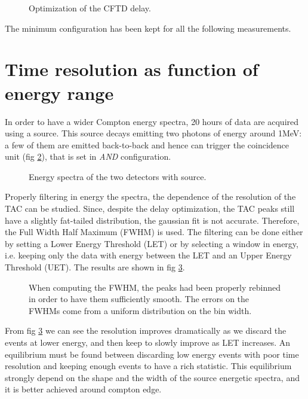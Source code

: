 \documentclass[11pt,a4 paper]{article}
\begin{document}
\begin{figure}[H]
    \centering
    \caption{Optimization of the CFTD delay.}
    \label{fig:CFTD:delay}
\end{figure}

The minimum configuration has been kept for all the following measurements.

\section{Time resolution as function of energy range} \label{sec:Co}
In order to have a wider Compton energy spectra, 20 hours of data are acquired using a  source. This source decays emitting two photons of energy around 1\si{\mega\electronvolt}: a few of them are emitted back-to-back and hence can trigger the coincidence unit (fig \ref{fig:Co:spectra}), that is set in \emph{AND} configuration.


\begin{figure}[H]
    \centering
    \caption{Energy spectra of the two detectors with  source.}
    \label{fig:Co:spectra}
\end{figure}

Properly filtering in energy the spectra, the dependence of the resolution of the TAC can be studied. Since, despite the delay optimization, the TAC peaks still have a slightly fat-tailed distribution, the gaussian fit is not accurate. Therefore, the Full Width Half Maximum (FWHM) is used.
The filtering can be done either by setting a Lower Energy Threshold (LET) or by selecting a window in energy, i.e. keeping only the data with energy between the LET and an Upper Energy Threshold (UET). The results are shown in fig \ref{fig:Co:results}.

\begin{figure}[H]
    \centering
    \caption{When computing the FWHM, the peaks had been properly rebinned in order to have them sufficiently smooth. The errors on the FWHMs come from a uniform distribution on the bin width.}
    \label{fig:Co:results}
\end{figure}

From fig \ref{fig:Co:results} we can see the resolution improves dramatically as we discard the events at lower energy, and then keep to slowly improve as LET increases. An equilibrium must be found between discarding low energy events with poor time resolution and keeping enough events to have a rich statistic. This equilibrium strongly depend on the shape and the width of the source energetic spectra, and it is better achieved around compton edge.
\end{document}
